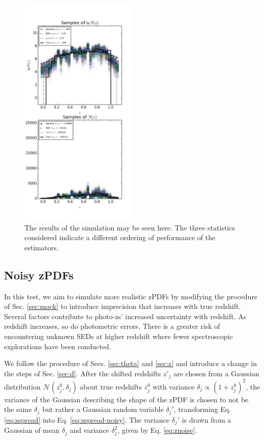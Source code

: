 \documentclass[preprint]{aastex}
\begin{document}
\begin{figure}
\includegraphics[width=0.5\textwidth]{samps-real.png}
\caption{The results of the simulation may be seen here.  The three statistics 
considered indicate a different ordering of performance of the estimators.}
\label{fig:nullparam}
\end{figure}

\clearpage
\subsection{Noisy zPDFs}
\label{sec:noisy}

In this test, we aim to simulate more realistic zPDFs by modifying the 
procedure of Sec. \ref{sec:mock} to introduce imprecision that increases with 
true redshift.  Several factors contribute to photo-zs' increased uncertainty 
with redshift.  As redshift increases, so do photometric errors.  There is a 
greater risk of encountering unknown SEDs at higher redshift where fewer 
spectroscopic explorations have been conducted.  

We follow the procedure of Secs. \ref{sec:theta} and \ref{sec:z} and introduce 
a change in the steps of Sec. \ref{sec:d}.  After the shifted redshifts 
$z'_{j}$ are chosen from a Gaussian distribution 
$\mathcal{N}(z_{j}^{0},\delta_{j})$ about true redshifts $z_{j}^{0}$ with 
variance $\delta_{j}\propto(1+z_{j}^{0})^{2}$, the variance of the Gaussian 
describing the shape of the zPDF is chosen to not be the same $\delta_{j}$ but 
rather a Gaussian random variable $\delta_{j}'$, transforming Eq. 
\ref{eq:zspread} into Eq. \ref{eq:zspread-noisy}.  The variance $\delta_{j}'$ 
is drawn from a Gaussian of mean $\delta_{j}$ and variance $\delta_{j}^{2}$, 
given by Eq. \ref{eq:znoise}.
\end{document}
